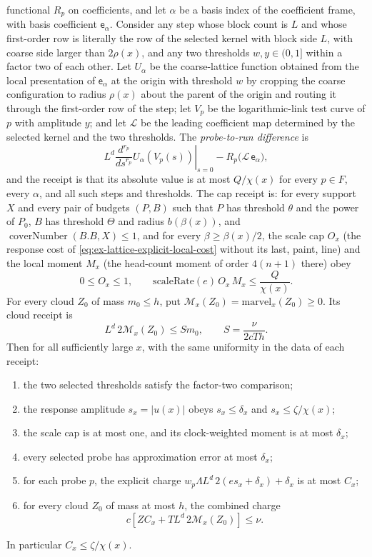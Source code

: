 \begin{theorem}
functional $R_p$ on coefficients, and let $\alpha$ be a basis index of the
coefficient frame, with basis coefficient $\mathsf e_\alpha$. Consider any
step whose block count is $L$ and whose first-order row is literally the
row of the selected kernel with block side $L$, with coarse side larger
than $2\rho(x)$, and any two thresholds $w,y\in(0,1]$ within a factor two
of each other. Let $U_\alpha$ be the coarse-lattice function obtained from the
local presentation of $\mathsf e_\alpha$ at the origin with threshold $w$
by cropping the coarse configuration to radius $\rho(x)$ about the parent
of the origin and routing it through the first-order row of the step; let
$V_p$ be the logarithmic-link test curve of $p$ with amplitude $y$; and
let $\mathcal L$ be the leading coefficient map determined by the selected
kernel and the two thresholds. The
\emph{probe-to-run difference} is
\[
 L^d\left.\frac{d^{r_p}}{ds^{r_p}}U_\alpha(V_p(s))\right|_{s=0}
   -R_p\bigl(\mathcal L\,\mathsf e_\alpha\bigr),
\]
and the receipt is that its absolute value is at most $Q/\chi(x)$ for
every $p\in F$, every $\alpha$, and all such steps and thresholds. The cap
receipt is: for every support $X$ and every pair of budgets $(P,B)$ such
that $P$ has threshold $\theta$ and the power of $P_0$, $B$ has threshold
$\Theta$ and radius $b(\beta(x))$, and
$\operatorname{coverNumber}(B.B,X)\le1$, and for every
$\beta\ge\beta(x)/2$, the scale cap $O_x$ (the response cost of
\eqref{eq:ex-lattice-explicit-local-cost} without its last, paint, line)
and the local moment $M_x$ (the
head-count moment of order $4(n+1)$ there) obey
\begin{equation}
 0\le O_x\le1,\qquad
 \mathrm{scaleRate}(e)\,O_x\,M_x\le \frac{Q}{\chi(x)}.
 \label{eq:ex-lattice-eve-cap}
\end{equation}
For every cloud $Z_0$ of mass $m_0\le h$, put
$\mathcal M_x(Z_0)=\mathrm{marvel}_x(Z_0)\ge0$. Its cloud receipt is
\begin{equation}
 L^d\,2\mathcal M_x(Z_0)\le S m_0,
 \qquad S=\frac{\nu}{2cTh}.
 \label{eq:ex-lattice-eve-cloud}
\end{equation}
Then for all sufficiently large $x$, with the same uniformity in the data
of each receipt:

\begin{enumerate}
\item the two selected thresholds satisfy the factor-two comparison;
\item the response amplitude $s_x=|u(x)|$ obeys $s_x\le\delta_x$ and
      $s_x\le\zeta/\chi(x)$;
\item the scale cap is at most one, and its clock-weighted moment is at most
      $\delta_x$;
\item every selected probe has approximation error at most $\delta_x$;
\item for each probe $p$, the explicit charge
      $w_p\Lambda L^d\,2(e s_x+\delta_x)+\delta_x$ is at most $C_x$;
\item for every cloud $Z_0$ of mass at most $h$, the combined charge
\[
 c\left[Z C_x+T L^d\,2\mathcal M_x(Z_0)\right]\le\nu.
\]
\end{enumerate}
In particular $C_x\le\zeta/\chi(x)$.
\end{theorem}

